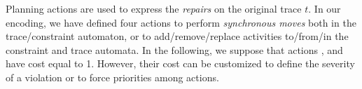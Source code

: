 Planning actions are used to express the \emph{repairs} on the original trace $t$. %
In our encoding, we have defined four actions to perform \emph{synchronous moves} both in the trace/constraint automaton, or to add/remove/replace activities to/from/in the constraint and trace automata. In the following, we suppose that actions ,  and  have cost equal to 1. However, their cost can be customized to define the severity of a violation or to force priorities among actions.
%

